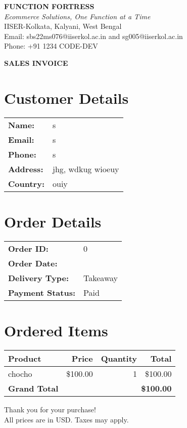 \documentclass[12pt]{article}
\begin{document}
\begin{center}
{\large\textbf{FUNCTION FORTRESS}}\\
\textit{Ecommerce Solutions, One Function at a Time}\\
IISER-Kolkata, Kalyani, West Bengal\\
Email: sbs22ms076@iiserkol.ac.in and sg005@iiserkol.ac.in\\
Phone: +91 1234 CODE-DEV
\end{center}

\begin{center}
{\Large\textbf{SALES INVOICE}}
\end{center}

\section*{Customer Details}
\begin{tabular}{ll}
\textbf{Name:} & s \\
\textbf{Email:} & s \\
\textbf{Phone:} & s \\
\textbf{Address:} & jhg, wdkug wioeuy \\
\textbf{Country:} & ouiy
\end{tabular}

\section*{Order Details}
\begin{tabular}{ll}
\textbf{Order ID:} & 0 \\
\textbf{Order Date:} &  \\
\textbf{Delivery Type:} & Takeaway \\
\textbf{Payment Status:} & Paid
\end{tabular}

\section*{Ordered Items}
\begin{tabular}{lrrr}
\toprule
\textbf{Product} & \textbf{Price} & \textbf{Quantity} & \textbf{Total} \\
\midrule
chocho & \${100.00} & 1 & \${100.00} \\
\midrule
\textbf{Grand Total} & \multicolumn{3}{r}{\textbf{\${100.00}}} \\
\bottomrule
\end{tabular}

\vfill
\begin{center}
{\small Thank you for your purchase!}\\
{\small All prices are in USD. Taxes may apply.}
\end{center}
\end{document}
